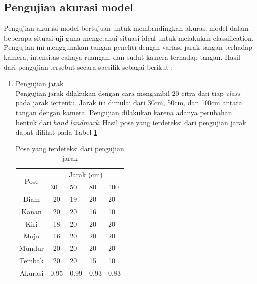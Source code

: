 \subsection{Pengujian akurasi model}
Pengujian akurasi model bertujuan untuk membandingkan akurasi model dalam beberapa situasi uji guna mengetahui situasi ideal untuk melakukan classification. Pengujian ini menggunakan tangan peneliti dengan variasi jarak tangan terhadap kamera, intensitas cahaya ruangan, dan sudut kamera terhadap tangan. Hasil dari pengujian tersebut secara spesifik sebagai berikut :
\begin{enumerate}
  \item Pengujian jarak \\
  Pengujian jarak dilakukan dengan cara mengambil 20 citra dari tiap \emph{class} pada jarak tertentu. Jarak ini dimulai dari 30cm, 50cm, dan 100cm antara tangan dengan kamera. Pengujian dilakukan karena adanya perubahan bentuk dari \emph{hand landmark}. Hasil pose yang terdeteksi dari pengujian jarak dapat dilihat pada Tabel \ref{tab:hasiljarak}

  \begin{table}[H]
    \centering
    \caption{Pose yang terdeteksi dari pengujian jarak}
    \label{tab:hasiljarak}
    \begin{tabular}{|c|clll|}
      \hline
      \multirow{2}{*}{Pose} & \multicolumn{4}{c|}{Jarak (cm)}                                                   \\ \cline{2-5} 
                            & \multicolumn{1}{l|}{30} & \multicolumn{1}{l|}{50} & \multicolumn{1}{l|}{80} & 100 \\ \hline
      Diam                  & \multicolumn{1}{c|}{20}   & \multicolumn{1}{l|}{19}   & \multicolumn{1}{l|}{20}   &   20  \\ \hline
      Kanan                 & \multicolumn{1}{c|}{20}   & \multicolumn{1}{l|}{20}   & \multicolumn{1}{l|}{16}   &   10  \\ \hline
      Kiri                  & \multicolumn{1}{c|}{18}   & \multicolumn{1}{l|}{20}   & \multicolumn{1}{l|}{20}   &   20  \\ \hline
      Maju                  & \multicolumn{1}{c|}{16}   & \multicolumn{1}{l|}{20}   & \multicolumn{1}{l|}{20}   &   20  \\ \hline
      Mundur                & \multicolumn{1}{c|}{20}   & \multicolumn{1}{l|}{20}   & \multicolumn{1}{l|}{20}   &   20  \\ \hline
      Tembak                & \multicolumn{1}{c|}{20}   & \multicolumn{1}{l|}{20}   & \multicolumn{1}{l|}{15}   &   10  \\ \hline
      Akurasi                  & \multicolumn{1}{c|}{0.95}   & \multicolumn{1}{l|}{0.99}   & \multicolumn{1}{l|}{0.93}   &   0.83  \\ \hline
    \end{tabular}
  \end{table}


\end{enumerate}
